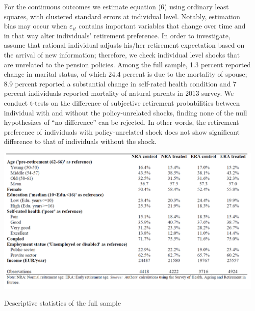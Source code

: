 \documentclass[a4paper]{article}
\begin{document}
For the continuous outcomes we estimate equation (6) using ordinary least squares, with clustered standard errors at individual level. Notably, estimation bias may occur when  $ε_{it}$ contains important variables that change over time and in that way alter individuals’ retirement preference. In order to investigate, assume that rational individual adjusts his/her retirement expectation based on the arrival of new information; therefore, we check individual level shocks that are unrelated to the pension policies. Among the full sample, 1.3 percent reported change in marital status, of which 24.4 percent is due to the mortality of spouse; 8.9 percent reported a substantial change in self-rated health condition and 7 percent individuals reported mortality of natural parents in 2013 survey. We conduct t-tests on the difference of subjective retirement probabilities between individual with and without the policy-unrelated shocks, finding none of the null hypothesizes of “no difference” can be rejected. In other words, the retirement preference of individuals with policy-unrelated shock does not show significant difference to that of individuals without the shock. 

\begin{table}[h] 
    \centering
    \includegraphics[width=1\linewidth]{table2.png}
    \caption{Descriptive statistics of the full sample}
    \label{2}
\end{table}
 
\end{document}
